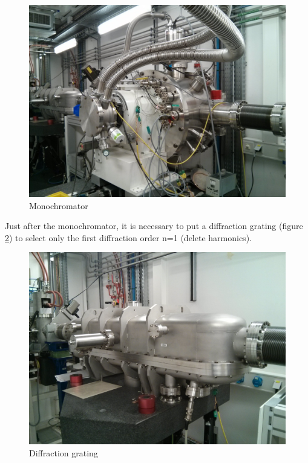 \documentclass[11pt,a4paper,oneside]{report}
\begin{document}
\begin{figure}[H]
    \begin{center}
        \includegraphics[scale=0.13]{Images/IMG_20151210_202721.jpg}
        \caption{Monochromator}
        \label{monochromateur}
    \end{center}
\end{figure}


Just after the monochromator, it is necessary to put a diffraction grating (figure \ref{Reseau_diffract}) to select only the first diffraction order n=1 (delete harmonics).

\begin{figure}[H]
    \begin{center}
        \includegraphics[scale=0.11]{Images/IMG_20151210_202740.jpg}
        \caption{Diffraction grating}
        \label{Reseau_diffract}
    \end{center}
\end{figure}
\end{document}
